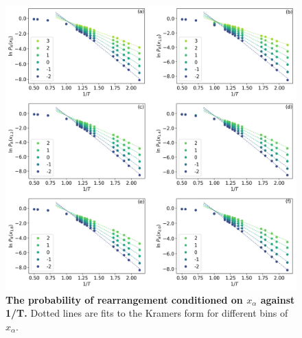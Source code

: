 \documentclass[aps,reprint,superscriptaddress,nofootinbib, notitlepage,prl]{revtex4-2}
\begin{document}
\begin{figure}[htp]
    \centering
    \includegraphics[width =2\linewidth]{SM_PR_x.png}
    \caption{ \textbf{The probability of rearrangement conditioned on $x_{\alpha}$ against 1/T.} Dotted lines are fits to the Kramers form for different bins of $x_\alpha$. }
    \label{fig:kramers_form_fitting_phop}
\end{figure}
\end{document}
